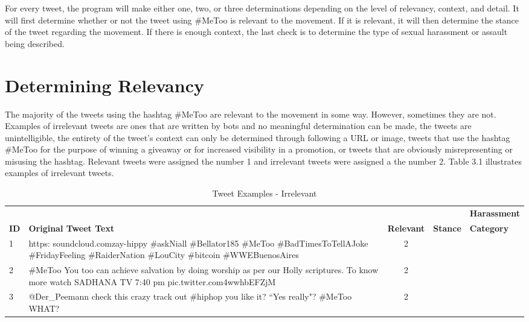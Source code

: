 For every tweet, the program will make either one, two, or three determinations depending on the level of relevancy, context, and detail. It will first determine whether or not the tweet using \#MeToo is relevant to the movement. If it is relevant, it will then determine the stance of the tweet regarding the movement. If there is enough context, the last check is to determine the type of sexual harassment or assault being described.

\section{Determining Relevancy}

The majority of the tweets using the hashtag \#MeToo are relevant to the movement in some way. However, sometimes they are not. Examples of irrelevant tweets are ones that are written by bots and no meaningful determination can be made, the tweets are unintelligible, the entirety of the tweet's context can only be determined through following a URL or image, tweets that use the hashtag \#MeToo for the purpose of winning a giveaway or for increased visibility in a promotion, or tweets that are obviously misrepresenting or misusing the hashtag. Relevant tweets were assigned the number 1 and irrelevant tweets were assigned a the number 2. Table 3.1 illustrates examples of irrelevant tweets.

\begin{table}[H]
    \centering
    \caption{Tweet Examples - Irrelevant}
    \begin{tabular}{m{1cm} m{8cm} m{1.5cm} m{1.1cm} m{2.1cm}}
        \toprule
        & {} & {} & {} & {\textbf{Harassment}} \\
        \rowcolor{White}\textbf{ID} & {\textbf{Original Tweet Text}} & {\textbf{Relevant}} & {\textbf{Stance}} & {\textbf{Category}} \\
                \midrule
        1 & { https:\/\/ soundcloud.com\/zay-hippy \#askNiall \#Bellator185 \#MeToo \#BadTimesToTellAJoke \#FridayFeeling \#RaiderNation \#LouCity \#bitcoin \#WWEBuenosAires } & \multicolumn{1}{c}{2} & \multicolumn{1}{c}{ } & \multicolumn{1}{c}{ }\\
        2 & { \#MeToo You too can achieve salvation by doing worship as per our Holly scriptures. To know more watch SADHANA TV 7:40 pm pic.twitter.com\/4wwhbEFZjM } & \multicolumn{1}{c}{2} & \multicolumn{1}{c}{ } & \multicolumn{1}{c}{ }\\
        3 & { @Der\_Peemann check this crazy track out \#hiphop you like it? ``Yes really"? \#MeToo WHAT? } & \multicolumn{1}{c}{2} & \multicolumn{1}{c}{ } & \multicolumn{1}{c}{ }\\
        \bottomrule
    \end{tabular}
\end{table}

